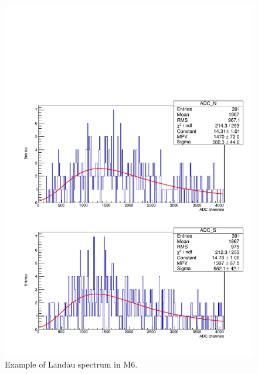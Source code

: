 \begin{figure}[ht]
  \centering
  \includegraphics[width=0.7\textwidth{}]{./fig/LandauFitM6.pdf}
  \caption{Example of Landau spectrum in M6.}
  \label{fig:Landau_M6}
\end{figure}

